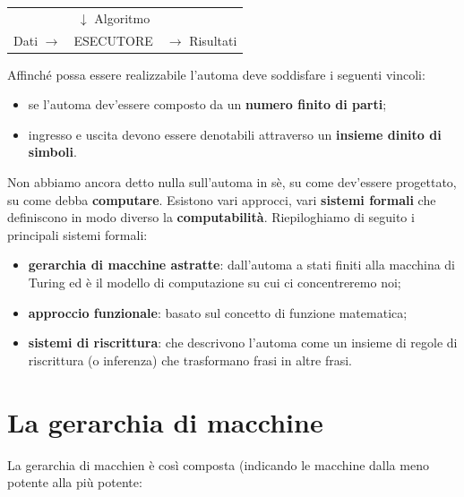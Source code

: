 \documentclass[11pt]{book}
\begin{document}
\vspace{20pt}
\begin{center}
\begin{tabular}{rcl}
& $\downarrow$ Algoritmo & \\
\cline{2-2}
Dati $\rightarrow$ & \vline ESECUTORE \vline & $\rightarrow$ Risultati \\
\cline{2-2}
\end{tabular}
\end{center}
\vspace{20pt}

Affinch\'e possa essere realizzabile l'automa deve soddisfare i
seguenti vincoli:

\begin{itemize}
\item se l'automa dev'essere composto da un \textbf{numero finito di
    parti};
\item ingresso e uscita devono essere denotabili attraverso un
  \textbf{insieme dinito di simboli}.
\end{itemize}


Non abbiamo ancora detto nulla sull'automa in s\`e, su come dev'essere
progettato, su come debba \textbf{computare}. Esistono vari approcci,
vari \textbf{sistemi formali} che definiscono in modo diverso la
\textbf{computabilit\`a}. Riepiloghiamo di seguito i principali
sistemi formali:

\begin{itemize}
\item \textbf{gerarchia di macchine astratte}: dall'automa a stati
  finiti alla macchina di Turing ed \`e il modello di computazione su
  cui ci concentreremo noi;
\item \textbf{approccio funzionale}: basato sul concetto di funzione
  matematica;
\item \textbf{sistemi di riscrittura}: che descrivono l'automa come un
  insieme di regole di riscrittura (o inferenza) che trasformano frasi
  in altre frasi.
\end{itemize}


\section{La gerarchia di macchine}

La gerarchia di macchien \`e cos\`i composta (indicando le macchine
dalla meno potente alla pi\`u potente:
\end{document}
